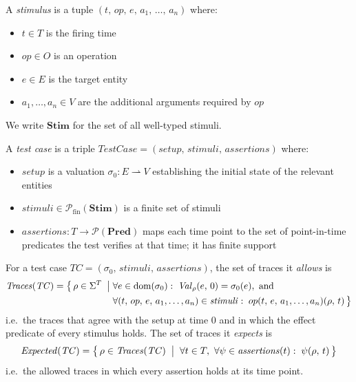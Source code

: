 \begin{definition}[Stimulus]\label{def:stimulus}
    A \emph{stimulus} is a tuple $(t,\, op,\, e,\, a_1,\, \ldots,\, a_n)$ where:
    \begin{itemize}
        \item $t \in T$ is the firing time
        \item $op \in O$ is an operation
        \item $e \in E$ is the target entity
        \item $a_1, \ldots, a_n \in V$ are the additional arguments required by $op$
    \end{itemize}
    We write $\mathbf{Stim}$ for the set of all well-typed stimuli.
\end{definition}

\begin{definition}\label{def:test_case}
    A \emph{test case} is a triple $\mathit{TestCase} = (\mathit{setup},\, \mathit{stimuli},\, \mathit{assertions})$ where:
    \begin{itemize}
        \item $\mathit{setup}$ is a valuation $\sigma_0 : E \rightharpoonup V$ establishing the initial state of the relevant entities
        \item $\mathit{stimuli} \in \mathcal{P}_{\mathrm{fin}}(\mathbf{Stim})$ is a finite set of stimuli
        \item $\mathit{assertions} : T \to \mathcal{P}(\mathbf{Pred})$ maps each time point to the set of point-in-time predicates the test verifies at that time; it has finite support
    \end{itemize}
\end{definition}

\begin{definition}\label{def:test_traces}
    For a test case $\mathit{TC} = (\sigma_0,\, \mathit{stimuli},\, \mathit{assertions})$, the set of traces it \emph{allows} is
    \[
        \begin{aligned}
            \mathit{Traces}(\mathit{TC}) = \bigl\{\, \rho \in \Sigma^T \;\bigm|\; & \forall e \in \mathrm{dom}(\sigma_0):\; \mathit{Val}_\rho(e,\, 0) = \sigma_0(e), \text{ and}                         \\
                                                                            & \forall (t,\, op,\, e,\, a_1, \ldots, a_n) \in \mathit{stimuli}:\; op(t,\, e,\, a_1, \ldots, a_n)(\rho,\, t) \,\bigr\}
        \end{aligned}
    \]
    i.e.\ the traces that agree with the setup at time $0$ and in which the effect predicate of every stimulus holds.
    The set of traces it \emph{expects} is
    \[
        \mathit{Expected}(\mathit{TC}) = \bigl\{\, \rho \in \mathit{Traces}(\mathit{TC}) \;\bigm|\; \forall t \in T,\ \forall \psi \in \mathit{assertions}(t):\; \psi(\rho,\, t) \,\bigr\}
    \]
    i.e.\ the allowed traces in which every assertion holds at its time point.
\end{definition}

